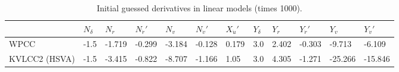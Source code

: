 \begin{table}[h]
    \scriptsize
    \caption{Initial guessed derivatives in linear models (times 1000).}
    \label{tab:initial}
    \begin{tabular}{|T|T|T|T|T|T|T|T|T|T|T|T|}
\hline
 & 

\( N_{\delta} \)
& 

\( N_{r} \)
& 

\( N_{\dot{r}}' \)
& 

\( N_{v} \)
& 

\( N_{\dot{v}}' \)
& 

\( X_{\dot{u}}' \)
& 

\( Y_{\delta} \)
& 

\( Y_{r} \)
& 

\( Y_{\dot{r}}' \)
& 

\( Y_{v} \)
& 

\( Y_{\dot{v}}' \)
\\
\hline

WPCC
&

-1.5
&

-1.719
&

-0.299
&

-3.184
&

-0.128
&

0.179
&

3.0
&

2.402
&

-0.303
&

-9.713
&

-6.109
\\

KVLCC2 (HSVA)
&

-1.5
&

-3.415
&

-0.822
&

-8.707
&

-1.166
&

1.05
&

3.0
&

4.305
&

-1.271
&

-25.266
&

-15.846
\\
\hline
\end{tabular}

\end{table}

